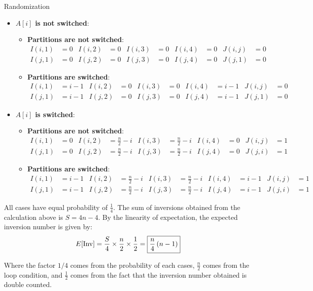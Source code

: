 \documentclass{article}
\begin{document}
\begin{section}{Randomization}
\begin{enumerate}
    \begin{itemize}
        \item {\bf $A[i]$ is not switched}:
        \begin{itemize}
            \item {\bf Partitions are not switched}:
                \begin{align*}
                    I(i, 1) &= 0 & I(i, 2) &= 0 & I(i, 3) &= 0 & I(i, 4) &= 0 & J(i, j) &= 0\\
                    I(j, 1) &= 0 & I(j, 2) &= 0 & I(j, 3) &= 0 & I(j, 4) &= 0 & J(j, 1) &= 0
                \end{align*}
            \item {\bf Partitions are switched}:
                \begin{align*}
                    I(i, 1) &= i-1 & I(i, 2) &= 0 & I(i, 3) &= 0 & I(i, 4) &= i-1 & J(i, j) &= 0 \\
                    I(j, 1) &= i-1 & I(j, 2) &= 0 & I(j, 3) &= 0 & I(j, 4) &= i-1 & J(j, 1) &= 0
                \end{align*}
        \end{itemize}
        \item {\bf $A[i]$ is switched}:
        \begin{itemize}
            \item {\bf Partitions are not switched}:
                \begin{align*}
                    I(i, 1) &= 0 & I(i, 2) &= \frac{n}{2}-i & I(i, 3) &= \frac{n}{2}-i & I(i, 4) &= 0 & J(i, j) &= 1 \\
                    I(j, 1) &= 0 & I(j, 2) &= \frac{n}{2}-i & I(j, 3) &= \frac{n}{2}-i & I(j, 4) &= 0 & J(j, i) &= 1
                \end{align*}
            \item {\bf Partitions are switched}:
                \begin{align*}
                    I(i, 1) &= i-1 & I(i, 2) &= \frac{n}{2}-i & I(i, 3) &= \frac{n}{2}-i & I(i, 4) &= i-1 & J(i, j) &= 1 \\
                    I(j, 1) &= i-1 & I(j, 2) &= \frac{n}{2}-i & I(j, 3) &= \frac{n}{2}-i & I(j, 4) &= i-1 & J(j, i) &= 1
                \end{align*}
        \end{itemize}
    \end{itemize}
    All cases have equal probability of $\frac{1}{4}$. The sum of inversions obtained from the calculation above is $S = 4n-4$. By the linearity of expectation, the expected inversion number is given by:
    \begin{align*}
        E[\text{Inv}] = \frac{S}{4} \times \frac{n}{2} \times \frac{1}{2} = \boxed{\frac{n}{4} \left(n - 1\right)}
    \end{align*}
    
    Where the factor $1/4$ comes from the probability of each cases, $\frac{n}{2}$ comes from the loop condition, and $\frac{1}{2}$ comes from the fact that the inversion number obtained is double counted.
    \end{enumerate}
\end{section}
\end{document}
